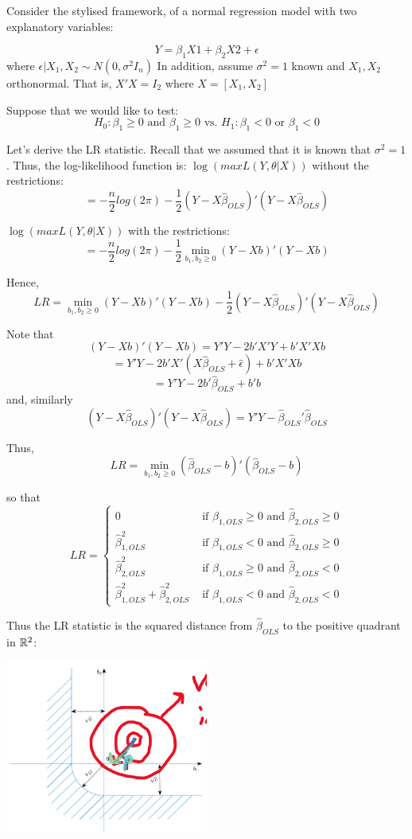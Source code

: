 \documentclass[DIV=14,titlepage=false]{scrreprt}
\begin{document}
Consider the stylised framework, of a normal regression model with two explanatory variables:

\[Y=\beta_1X1+\beta_2X2+\epsilon\]
where \(\epsilon|X_1,X_2\sim N(0,\sigma^2I_n)\) In addition, assume \(\sigma^2=1\) known and \(X_1,X_2\) orthonormal. That is, \(X'X=I_2\) where \(X=[X_1,X_2]\)

Suppose that we would like to test:
\[H_0:\beta_1\geq0 \text{ and } \beta_1\geq0 \text{ vs. }H_1:\beta_1<0 \text{ or } \beta_1<0\]

Let's derive the LR statistic. Recall that we assumed that it is known that \(\sigma^2=1\). Thus, the log-likelihood function is:
\(\log (max L(Y,\theta|X))\) without the restrictions:
\[=-\frac{n}{2}log(2\pi)-\frac{1}{2}(Y-X\hat{\beta}_{OLS})'(Y-X\hat{\beta}_{OLS})\]

\(\log (max L(Y,\theta|X))\) with the restrictions:
\[=-\frac{n}{2}log(2\pi)-\frac{1}{2}\operatorname*{min}_{b_1,b_2\geq0}(Y-Xb)'(Y-Xb)\]

Hence,
\[LR=\operatorname*{min}_{b_1,b_2\geq0}(Y-Xb)'(Y-Xb)-\frac{1}{2}(Y-X\hat{\beta}_{OLS})'(Y-X\hat{\beta}_{OLS})\]

Note that
\[(Y-Xb)'(Y-Xb)=Y'Y-2b'X'Y+b'X'Xb\]
\[=Y'Y-2b'X'(X\hat\beta_{OLS}+\hat\epsilon)+b'X'Xb\]
\[=Y'Y-2b'\hat\beta_{OLS}+b'b\]
and, similarly
\[(Y-X\hat\beta_{OLS})'(Y-X\hat\beta_{OLS})=Y'Y-\hat\beta_{OLS}'\hat\beta_{OLS}\]

Thus,
\[LR=\operatorname*{min}_{b_1,b_2\geq0}(\hat\beta_{OLS}-b)'(\hat\beta_{OLS}-b)\]

so that
\[LR=\begin{cases}0 & \text{ if }\hat\beta_{1,OLS}\geq0 \text{ and } \hat\beta_{2,OLS}\geq0
\\ \hat\beta_{1,OLS}^2 & \text{ if }\hat\beta_{1,OLS}<0 \text{ and } \hat\beta_{2,OLS}\geq0
\\ \hat\beta_{2,OLS}^2 & \text{ if }\hat\beta_{1,OLS}\geq0 \text{ and } \hat\beta_{2,OLS}<0
\\ \hat\beta_{1,OLS}^2+\hat\beta_{2,OLS}^2 & \text{ if }\hat\beta_{1,OLS}<0 \text{ and } \hat\beta_{2,OLS}<0
\end{cases}\]

Thus the LR statistic is the squared distance from \(\hat\beta_{OLS}\) to the positive quadrant in \(\mathbb{R}^2\):
\begin{center}
\includegraphics[width=0.5\textwidth]{LR test.png}
\end{center}
\end{document}
